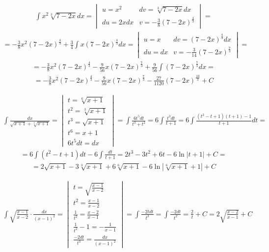 
\begin{gather*}\int x^2\sqrt[3]{7-2x}dx = \begin{vmatrix}
u=x^2 & dv=\sqrt[3]{7-2x}dx \\
du=2xdx & v=-\frac{3}{8}(7-2x)^{\frac{4}{3}}
\end{vmatrix} = \end{gather*}
\begin{gather*}= -\frac{3}{8}x^2(7-2x)^{\frac{4}{3}} + \frac{3}{4} \int x(7-2x)^{\frac{4}{3}}dx = \begin{vmatrix}
u=x & dv=(7-2x)^{\frac{4}{3}}dx \\
du=dx & v=-\frac{3}{14}(7-2x)^{\frac{7}{3}}
\end{vmatrix}  = \end{gather*}
\begin{gather*}= -\frac{3}{8}x^2(7-2x)^{\frac{4}{3}} -\frac{9}{56}x(7-2x)^{\frac{7}{3}} + \frac{9}{56}\int (7-2x)^{\frac{7}{3}}dx = \end{gather*}
\begin{gather*}= -\frac{3}{8}x^2(7-2x)^{\frac{4}{3}} -\frac{9}{56}x(7-2x)^{\frac{7}{3}} - \frac{27}{1120}(7-2x)^{\frac{10}{3}}+C\end{gather*}



\begin{gather*}\int \frac{dx}{\sqrt{x+1}+\sqrt[3]{x+1}} = \begin{vmatrix}
t=\sqrt[6]{x+1} \\
t^2=\sqrt[3]{x+1} \\
t^3=\sqrt{x+1} \\
t^6=x+1 \\
6t^5dt=dx
\end{vmatrix} = \int \frac{6t^5dt}{t^3+t^2} = 6 \int \frac{t^3dt}{t+1} = 6 \int \frac{(t^2-t+1)(t+1)-1}{t+1}dt = \end{gather*}
\begin{gather*}= 6 \int (t^2-t+1)dt - 6\int \frac{dt}{t+1} = 2t^3-3t^2+6t-6\ln|t+1|+C = \end{gather*}
\begin{gather*}= 2\sqrt{x+1}-3\sqrt[3]{x+1}+6\sqrt[6]{x+1}-6\ln|\sqrt[6]{x+1}+1|+C\end{gather*}



\begin{gather*}\int \sqrt{\frac{x-1}{x-2}} \cdot \frac{dx}{(x-1)^2} = \begin{vmatrix}
t=\sqrt{\frac{x-1}{x-2}} \\
t^2=\frac{x-1}{x-2} \\
\frac{1}{t^2}=\frac{x-2}{x-1} \\
\frac{1}{t^2}-1=-\frac{1}{x-1}\\
\frac{-2dt}{t^3}=\frac{dx}{(x-1)^2}
\end{vmatrix} = \int \frac{-2tdt}{t^3} = \int \frac{-2dt}{t^2} = \frac{2}{t}+C = 2\sqrt{\frac{x-2}{x-1}}+C \end{gather*}


